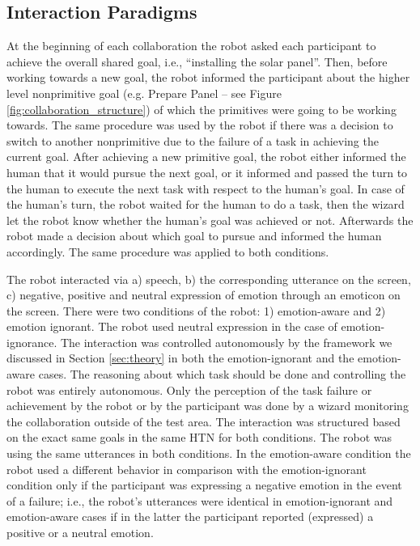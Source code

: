 \documentclass[12pt]{report}
\begin{document}
\subsection{Interaction Paradigms}
\label{sec-interaction-paradigms}
At the beginning of each collaboration the robot asked each participant to
achieve the overall shared goal, i.e., ``installing the solar panel''. Then,
before working towards a new goal, the robot informed the participant about the
higher level nonprimitive goal (e.g. Prepare Panel -- see Figure
\ref{fig:collaboration_structure}) of which the primitives were going to be
working towards. The same procedure was used by the robot if there was a
decision to switch to another nonprimitive due to the failure of a task in
achieving the current goal. After achieving a new primitive goal, the robot
either informed the human that it would pursue the next goal, or it informed and
passed the turn to the human to execute the next task with respect to the
human's goal. In case of the human's turn, the robot waited for the human to do
a task, then the wizard let the robot know whether the human's goal was achieved
or not. Afterwards the robot made a decision about which goal to pursue and
informed the human accordingly. The same procedure was applied to both
conditions.

The robot interacted via a) speech, b) the corresponding utterance on the
screen, c) negative, positive and neutral expression of emotion through an
emoticon on the screen. There were two conditions of the robot: 1)
emotion-aware and 2) emotion ignorant. The robot used neutral expression in the
case of emotion-ignorance. The interaction was controlled autonomously by the
framework we discussed in Section \ref{sec:theory} in both the emotion-ignorant
and the emotion-aware cases. The reasoning about which task should be done and
controlling the robot was entirely autonomous. Only the perception of the task
failure or achievement by the robot or by the participant was done by a wizard
monitoring the collaboration outside of the test area. The interaction was
structured based on the exact same goals in the same HTN for both conditions.
The robot was using the same utterances in both conditions. In the emotion-aware
condition the robot used a different behavior in comparison with the
emotion-ignorant condition only if the participant was expressing a negative
emotion in the event of a failure; i.e., the robot's utterances were identical
in emotion-ignorant and emotion-aware cases if in the latter the participant
reported (expressed) a positive or a neutral emotion.
\end{document}
